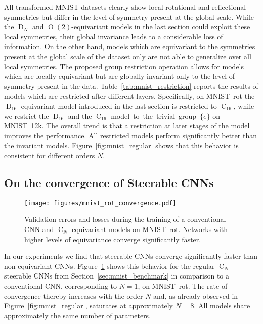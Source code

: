 \documentclass{article}
\renewcommand{\O}[1]{\ensuremath{\operatorname{O}(#1)}}
\newcommand{\D}[1]{\ensuremath{\operatorname{D}_{#1}}}
\newcommand{\C}[1]{\ensuremath{\operatorname{C}_{#1}}}
\newcommand{\DN}{\ensuremath{\operatorname{D}_{\!N}}}
\newcommand{\CN}{\ensuremath{\operatorname{C}_{\!N}}}
\newlength{\secBefore}
\newlength{\secAfter}
\newlength{\subsecBefore}
\newlength{\subsecAfter}
\begin{document}
All transformed MNIST datasets clearly show local rotational and reflectional symmetries but differ in the level of symmetry present at the global scale.
While the $\DN$ and $\O2$-equivariant models in the last section could exploit these local symmetries, their global invariance leads to a considerable loss of information.
On the other hand, models which are equivariant to the symmetries present at the global scale of the dataset only are not able to generalize over all local symmetries.
The proposed group restriction operation allows for models which are locally equivariant but are globally invariant only to the level of symmetry present in the data.
Table~\ref{tab:mnist_restriction} reports the results of models which are restricted after different layers.
Specifically, on MNIST~rot the $\D{16}$-equivariant model introduced in the last section is restricted to $\C{16}$, while we restrict the $\D{16}$ and the $\C{16}$ model~to~the~trivial~group~$\{e\}$ on MNIST~12k.
The overall trend is that a restriction at later stages of the model improves the performance.
All restricted models perform significantly better than the invariant models.
Figure~\ref{fig:mnist_regular} shows that this behavior is consistent for different orders $N$.






\vspace*{\subsecBefore}
\subsection{On the convergence of Steerable CNNs}
\label{sec:mnist_rot_convergence}
\vspace*{\subsecAfter}

\begin{figure}[t]
    \centering
    \texttt{[image: figures/mnist\_rot\_convergence.pdf]}
    \begin{minipage}{.95\linewidth}
        \vspace*{2pt}
        \caption{
            Validation errors and losses during the training of a conventional CNN and $\CN$-equivariant models on MNIST~rot.
            Networks with higher levels of equivariance converge significantly faster.
        }
        \label{fig:mnist_convergence}
    \end{minipage}
\end{figure}

In our experiments we find that steerable CNNs converge significantly faster than non-equivariant CNNs.
Figure~\ref{fig:mnist_convergence} shows this behavior for the regular $\CN$-steerable CNNs from Section~\ref{sec:mnist_benchmark} in comparison to a conventional CNN, corresponding to $N=1$, on MNIST~rot.
The rate of convergence thereby increases with the order $N$ and, as already observed in Figure~\ref{fig:mnist_regular}, saturates at approximately $N=8$.
All models share approximately the same number of parameters.
\end{document}
